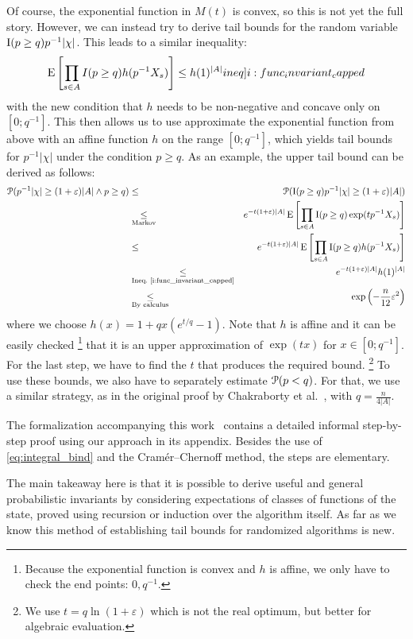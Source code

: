 Of course, the exponential function in $M(t)$ is convex, so this is not yet the full story.
However, we can instead try to derive tail bounds for the random variable $\operatorname{\mathrm{I}}(p \geq q) p^{-1} |\chi|$.
This leads to a similar inequality:
\begin{align}
  \expect \left[ \prod_{s \in A} I(p \geq q) h(p^{-1} X_s) \right] \leq h(1)^{|A|} \label[ineq]{i:func_invariant_capped}
\end{align}
with the new condition that $h$ needs to be non-negative and concave only on $[0;q^{-1}]$.
This then allows us to use approximate the exponential function from above with an affine function $h$ on the range $[0;q^{-1}]$, which yields tail bounds for $p^{-1} |\chi|$ under the condition $p \geq q$. As an example, the upper tail bound can be derived as follows: %
\begin{eqnarray*}
  \operatorname{\mathcal P}( p^{-1} |\chi| \geq (1+\varepsilon) |A| \wedge p \geq q) & \leq &
  \operatorname{\mathcal P}( \operatorname{\mathrm{I}}(p \geq q) p^{-1} |\chi| \geq (1+\varepsilon) |A|) \\
  & \underset{\textrm{Markov}}{\leq} & e^{-t(1+\varepsilon) |A|} \operatorname{\mathrm{E}} \left[ \prod_{s \in A} \operatorname{\mathrm{I}}(p \geq q) \exp( t p^{-1} X_s) \right] \\
  & \leq & e^{-t(1+\varepsilon) |A|} \operatorname{\mathrm{E}} \left[ \prod_{s \in A} \operatorname{\mathrm{I}}(p \geq q) h(p^{-1} X_s) \right] \\
  & \underset{\textrm{Ineq.~\ref{i:func_invariant_capped}}}{\leq} & e^{-t(1+\varepsilon) |A|} h(1)^{|A|} \\
  & \underset{\textrm{By calculus}}{\leq} & \exp\left(-\frac{n}{12} \varepsilon^2\right)
\end{eqnarray*}
where we choose $h(x) = 1+qx (e^{t/q}-1)$.
Note that $h$ is affine and it can be easily checked%
\footnote{Because the exponential function is convex and $h$ is affine, we only have to check the end points: $0, q^{-1}$.}
that it is an upper approximation of $\exp(tx)$ for $x \in [0;q^{-1}]$.
For the last step, we have to find the $t$ that produces the required bound.%
\footnote{We use $t = q \ln(1+\varepsilon)$ which is not the real optimum, but better for algebraic evaluation.}
To use these bounds, we also have to separately estimate $\operatorname{\mathcal P}(p < q)$.
For that, we use a similar strategy, as in the original proof by Chakraborty et al.~\cite{chakraborty2022}, with $q = \frac{n}{4 |A|}$.

The formalization accompanying this work~\todo{[cite]} contains a detailed informal step-by-step proof using our approach in its appendix.
Besides the use of \cref{eq:integral_bind} and the Cram\'er--Chernoff method, the steps are elementary.

The main takeaway here is that it is possible to derive useful and general probabilistic invariants by considering expectations of classes of functions of the state, proved using recursion or induction over the algorithm itself.
As far as we know this method of establishing tail bounds for randomized algorithms is new.
